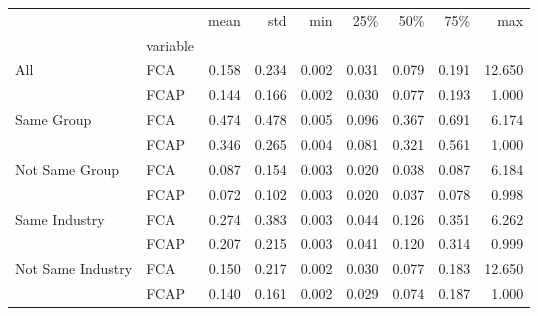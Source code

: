 \begin{tabular}{llrrrrrrr}
\toprule
                  &      &   mean &    std &    min &    25\% &    50\% &    75\% &     max \\
 & variable &        &        &        &        &        &        &         \\
\midrule
All & FCA &  0.158 &  0.234 &  0.002 &  0.031 &  0.079 &  0.191 &  12.650 \\
                  & FCAP &  0.144 &  0.166 &  0.002 &  0.030 &  0.077 &  0.193 &   1.000 \\
Same Group & FCA &  0.474 &  0.478 &  0.005 &  0.096 &  0.367 &  0.691 &   6.174 \\
                  & FCAP &  0.346 &  0.265 &  0.004 &  0.081 &  0.321 &  0.561 &   1.000 \\
Not Same Group & FCA &  0.087 &  0.154 &  0.003 &  0.020 &  0.038 &  0.087 &   6.184 \\
                  & FCAP &  0.072 &  0.102 &  0.003 &  0.020 &  0.037 &  0.078 &   0.998 \\
Same Industry & FCA &  0.274 &  0.383 &  0.003 &  0.044 &  0.126 &  0.351 &   6.262 \\
                  & FCAP &  0.207 &  0.215 &  0.003 &  0.041 &  0.120 &  0.314 &   0.999 \\
Not Same Industry & FCA &  0.150 &  0.217 &  0.002 &  0.030 &  0.077 &  0.183 &  12.650 \\
                  & FCAP &  0.140 &  0.161 &  0.002 &  0.029 &  0.074 &  0.187 &   1.000 \\
\bottomrule
\end{tabular}
